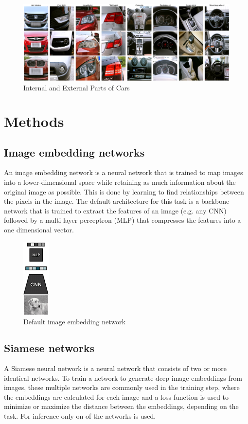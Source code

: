 \documentclass[12pt,a4paper]{report}
\begin{document}
\begin{figure}[h]
    \centering
    \includegraphics[width=\textwidth]{./images/carparst.png}
	\caption{Internal and External Parts of Cars}
\end{figure}


\newpage


\chapter{Methods}
\section{Image embedding networks}


An image embedding network is a neural network that is trained to map images into a lower-dimensional space while retaining as much information about the original image as possible.
This is done by learning to find relationships between the pixels in the image.
The default architecture for this task is a backbone network that is trained to extract the features of an image (e.g. any CNN) followed by a multi-layer-perceptron (MLP) that compresses the features into a one dimensional vector.  

\begin{figure}[h]
    \centering
	\includegraphics[height=4cm]{./images/embedding_network.png}
	\caption{Default image embedding network}
\end{figure}

\newpage

\section{Siamese networks}
A Siamese neural network is a neural network that consists of two or more identical networks.\cite{signatureVerification}
To train a network to generate deep image embeddings from images, these multiple networks are commonly used in the training step,
where the embeddings are calculated for each image and a loss function is used to minimize or maximize the distance between the embeddings,
depending on the task. For inference only on of the networks is used.
\end{document}
